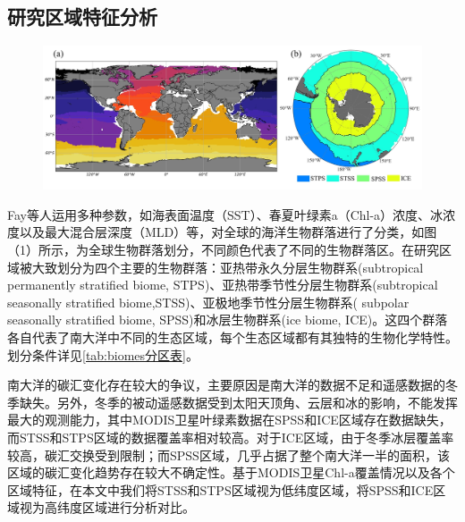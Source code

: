 \subsection{研究区域特征分析}
\begin{figure}[htbp]
    \centering
    \includegraphics[width=\linewidth]{figure/第二章用图/图2.2-生物分区.jpg}
\end{figure}

Fay等人\cite{fay2014global}运用多种参数，如海表面温度（SST）、春夏叶绿素a（Chl-a）浓度、冰浓度以及最大混合层深度（MLD）等，对全球的海洋生物群落进行了分类，如图（1）所示，为全球生物群落划分，不同颜色代表了不同的生物群落区。在研究区域被大致划分为四个主要的生物群落：亚热带永久分层生物群系(subtropical permanently stratified biome, STPS)、亚热带季节性分层生物群系(subtropical seasonally stratified biome,STSS)、亚极地季节性分层生物群系( subpolar seasonally stratified biome, SPSS)和冰层生物群系(ice biome, ICE)。这四个群落各自代表了南大洋中不同的生态区域，每个生态区域都有其独特的生物化学特性。划分条件详见\autoref{tab:biomes分区表}。

南大洋的碳汇变化存在较大的争议，主要原因是南大洋的数据不足和遥感数据的冬季缺失。另外，冬季的被动遥感数据受到太阳天顶角、云层和冰的影响，不能发挥最大的观测能力，其中MODIS卫星叶绿素数据在SPSS和ICE区域存在数据缺失，而STSS和STPS区域的数据覆盖率相对较高。对于ICE区域，由于冬季冰层覆盖率较高，碳汇交换受到限制；而SPSS区域，几乎占据了整个南大洋一半的面积，该区域的碳汇变化趋势存在较大不确定性。基于MODIS卫星Chl-a覆盖情况以及各个区域特征，在本文中我们将STSS和STPS区域视为低纬度区域，将SPSS和ICE区域视为高纬度区域进行分析对比。


